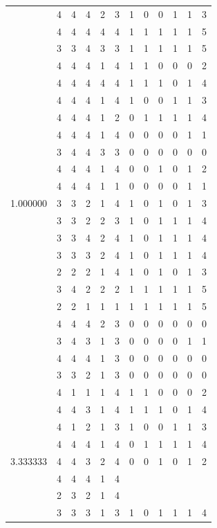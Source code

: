 \documentclass[]{book}
\theoremstyle{definition}
\theoremstyle{definition}
\theoremstyle{definition}
\theoremstyle{remark}
\begin{document}
\begin{table}
{\begin{tabular}[t]{rrrrrrrrrrrr}
 & 4 & 4 & 4 & 2 & 3 & 1 & 0 & 0 & 1 & 1 & 3\\
 & 4 & 4 & 4 & 4 & 4 & 1 & 1 & 1 & 1 & 1 & 5\\
 & 3 & 3 & 4 & 3 & 3 & 1 & 1 & 1 & 1 & 1 & 5\\
 & 4 & 4 & 4 & 1 & 4 & 1 & 1 & 0 & 0 & 0 & 2\\
 & 4 & 4 & 4 & 4 & 4 & 1 & 1 & 1 & 0 & 1 & 4\\
 & 4 & 4 & 4 & 1 & 4 & 1 & 0 & 0 & 1 & 1 & 3\\
 & 4 & 4 & 4 & 1 & 2 & 0 & 1 & 1 & 1 & 1 & 4\\
 & 4 & 4 & 4 & 1 & 4 & 0 & 0 & 0 & 0 & 1 & 1\\
 & 3 & 4 & 4 & 3 & 3 & 0 & 0 & 0 & 0 & 0 & 0\\
 & 4 & 4 & 4 & 1 & 4 & 0 & 0 & 1 & 0 & 1 & 2\\
 & 4 & 4 & 4 & 1 & 1 & 0 & 0 & 0 & 0 & 1 & 1\\
1.000000 & 3 & 3 & 2 & 1 & 4 & 1 & 0 & 1 & 0 & 1 & 3\\
 & 3 & 3 & 2 & 2 & 3 & 1 & 0 & 1 & 1 & 1 & 4\\
 & 3 & 3 & 4 & 2 & 4 & 1 & 0 & 1 & 1 & 1 & 4\\
 & 3 & 3 & 3 & 2 & 4 & 1 & 0 & 1 & 1 & 1 & 4\\
 & 2 & 2 & 2 & 1 & 4 & 1 & 0 & 1 & 0 & 1 & 3\\
 & 3 & 4 & 2 & 2 & 2 & 1 & 1 & 1 & 1 & 1 & 5\\
 & 2 & 2 & 1 & 1 & 1 & 1 & 1 & 1 & 1 & 1 & 5\\
 & 4 & 4 & 4 & 2 & 3 & 0 & 0 & 0 & 0 & 0 & 0\\
 & 3 & 4 & 3 & 1 & 3 & 0 & 0 & 0 & 0 & 1 & 1\\
 & 4 & 4 & 4 & 1 & 3 & 0 & 0 & 0 & 0 & 0 & 0\\
 & 3 & 3 & 2 & 1 & 3 & 0 & 0 & 0 & 0 & 0 & 0\\
 & 4 & 1 & 1 & 1 & 4 & 1 & 1 & 0 & 0 & 0 & 2\\
 & 4 & 4 & 3 & 1 & 4 & 1 & 1 & 1 & 0 & 1 & 4\\
 & 4 & 1 & 2 & 1 & 3 & 1 & 0 & 0 & 1 & 1 & 3\\
 & 4 & 4 & 4 & 1 & 4 & 0 & 1 & 1 & 1 & 1 & 4\\
3.333333 & 4 & 4 & 3 & 2 & 4 & 0 & 0 & 1 & 0 & 1 & 2\\
 & 4 & 4 & 4 & 1 & 4 &  &  &  &  &  & \\
 & 2 & 3 & 2 & 1 & 4 &  &  &  &  &  & \\
 & 3 & 3 & 3 & 1 & 3 & 1 & 0 & 1 & 1 & 1 & 4\\

\end{tabular}}
\end{table}
\end{document}
